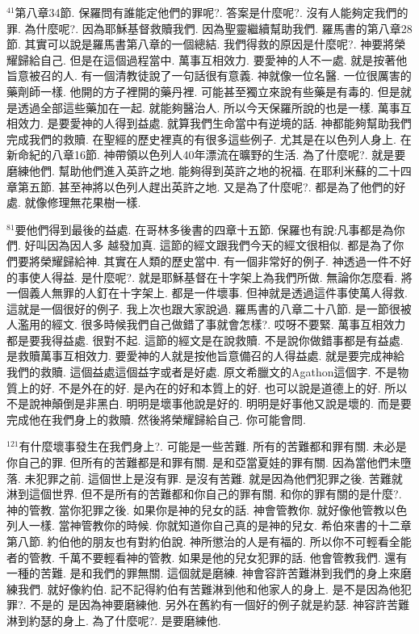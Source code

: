 \documentclass{book}
\begin{document}
$^{41}$第八章34節.
保羅問有誰能定他們的罪呢?.
答案是什麼呢?.
沒有人能夠定我們的罪.
為什麼呢?.
因為耶穌基督救贖我們.
因為聖靈繼續幫助我們.
羅馬書的第八章28節.
其實可以說是羅馬書第八章的一個總結.
我們得救的原因是什麼呢?.
神要將榮耀歸給自己.
但是在這個過程當中.
萬事互相效力.
要愛神的人不一處.
就是按著他旨意被召的人.
有一個清教徒說了一句話很有意義.
神就像一位名醫.
一位很厲害的藥劑師一樣.
他開的方子裡開的藥丹裡.
可能甚至獨立來說有些藥是有毒的.
但是就是透過全部這些藥加在一起.
就能夠醫治人.
所以今天保羅所說的也是一樣.
萬事互相效力.
是要愛神的人得到益處.
就算我們生命當中有逆境的話.
神都能夠幫助我們完成我們的救贖.
在聖經的歷史裡真的有很多這些例子.
尤其是在以色列人身上.
在新命紀的八章16節.
神帶領以色列人40年漂流在曠野的生活.
為了什麼呢?.
就是要磨練他們.
幫助他們進入英許之地.
能夠得到英許之地的祝福.
在耶利米蘇的二十四章第五節.
甚至神將以色列人趕出英許之地.
又是為了什麼呢?.
都是為了他們的好處.
就像修理無花果樹一樣.

$^{81}$要他們得到最後的益處.
在哥林多後書的四章十五節.
保羅也有說:凡事都是為你們.
好叫因為因人多 越發加真.
這節的經文跟我們今天的經文很相似.
都是為了你們要將榮耀歸給神.
其實在人類的歷史當中.
有一個非常好的例子.
神透過一件不好的事使人得益.
是什麼呢?.
就是耶穌基督在十字架上為我們所做.
無論你怎麼看.
將一個義人無罪的人釘在十字架上.
都是一件壞事.
但神就是透過這件事使萬人得救.
這就是一個很好的例子.
我上次也跟大家說過.
羅馬書的八章二十八節.
是一節很被人濫用的經文.
很多時候我們自己做錯了事就會怎樣?.
哎呀不要緊.
萬事互相效力都是要我得益處.
很對不起.
這節的經文是在說救贖.
不是說你做錯事都是有益處.
是救贖萬事互相效力.
要愛神的人就是按他旨意備召的人得益處.
就是要完成神給我們的救贖.
這個益處這個益字或者是好處.
原文希臘文的Agathon這個字.
不是物質上的好.
不是外在的好.
是內在的好和本質上的好.
也可以說是道德上的好.
所以不是說神顛倒是非黑白.
明明是壞事他說是好的.
明明是好事他又說是壞的.
而是要完成他在我們身上的救贖.
然後將榮耀歸給自己.
你可能會問.

$^{121}$有什麼壞事發生在我們身上?.
可能是一些苦難.
所有的苦難都和罪有關.
未必是你自己的罪.
但所有的苦難都是和罪有關.
是和亞當夏娃的罪有關.
因為當他們未墮落.
未犯罪之前.
這個世上是沒有罪.
是沒有苦難.
就是因為他們犯罪之後.
苦難就淋到這個世界.
但不是所有的苦難都和你自己的罪有關.
和你的罪有關的是什麼?.
神的管教.
當你犯罪之後.
如果你是神的兒女的話.
神會管教你.
就好像他管教以色列人一樣.
當神管教你的時候.
你就知道你自己真的是神的兒女.
希伯來書的十二章第八節.
約伯他的朋友也有對約伯說.
神所懲治的人是有福的.
所以你不可輕看全能者的管教.
千萬不要輕看神的管教.
如果是他的兒女犯罪的話.
他會管教我們.
還有一種的苦難.
是和我們的罪無關.
這個就是磨練.
神會容許苦難淋到我們的身上來磨練我們.
就好像約伯.
記不記得約伯有苦難淋到他和他家人的身上.
是不是因為他犯罪?.
不是的 是因為神要磨練他.
另外在舊約有一個好的例子就是約瑟.
神容許苦難淋到約瑟的身上.
為了什麼呢?.
是要磨練他.
\end{document}
